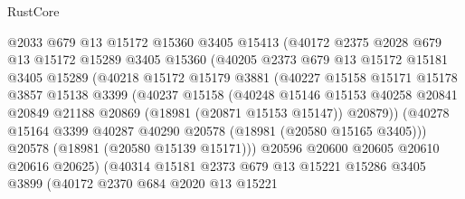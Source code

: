 \begin{lexlean}{RustCore}
\begin{coremodule}
                    @2033
                    @679
                    @13
                    @15172
                    @15360
                    @3405
                    @15413
                    (@40172
                      @2375
                      @2028
                      @679
                      @13
                      @15172
                      @15289
                      @3405
                      @15360
                      (@40205
                        @2373
                        @679
                        @13
                        @15172
                        @15181
                        @3405
                        @15289
                        (@40218
                          @15172
                          @15179
                          @3881
                          (@40227
                            @15158
                            @15171
                            @15178
                            @3857
                            @15138
                            @3399
                            (@40237
                              @15158
                              (@40248
                                @15146
                                @15153
                                @40258
                                @20841
                                @20849
                                @21188
                                @20869
                                (@18981 (@20871 @15153 @15147))
                                @20879))
                            (@40278
                              @15164
                              @3399
                              @40287
                              @40290
                              @20578
                              (@18981 (@20580 @15165 @3405)))
                            @20578
                            (@18981 (@20580 @15139 @15171)))
                          @20596
                          @20600
                          @20605
                          @20610
                          @20616
                          @20625)
                        (@40314
                          @15181
                          @2373
                          @679
                          @13
                          @15221
                          @15286
                          @3405
                          @3899
                          (@40172
                            @2370
                            @684
                            @2020
                            @13
                            @15221

\end{coremodule}
\end{lexlean}
